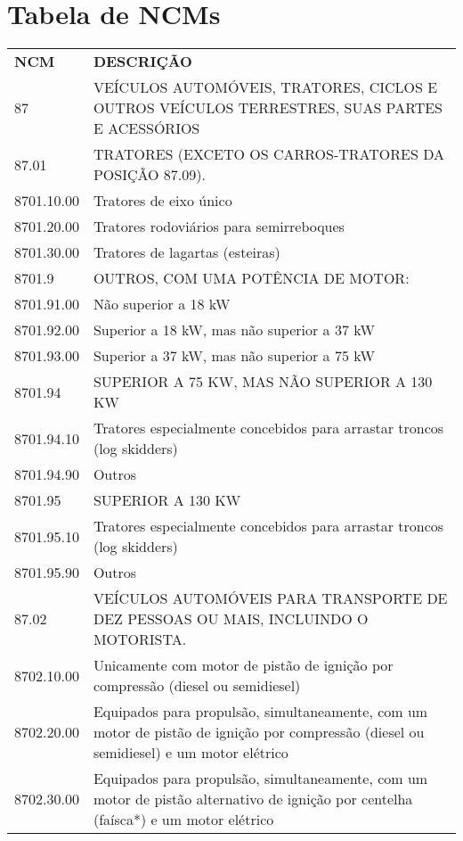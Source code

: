 \documentclass{article}
\begin{document}
\pagebreak
\section{Tabela de NCMs}
\label{sec:tabela-ncm}
\begin{center}
  \begin{longtable}{
    |p{}
    |p{}|
  }
    \hline
    \rowcolor{darkGrey}
    \textbf{NCM} & \textbf{DESCRIÇÃO} \\
    87 & VEÍCULOS AUTOMÓVEIS, TRATORES, CICLOS E OUTROS VEÍCULOS TERRESTRES, SUAS PARTES E ACESSÓRIOS \\
    87.01 & TRATORES (EXCETO OS CARROS-TRATORES DA POSIÇÃO 87.09). \\
    8701.10.00 & Tratores de eixo único \\
    8701.20.00 & Tratores rodoviários para semirreboques \\
    8701.30.00 & Tratores de lagartas (esteiras) \\
    8701.9 & OUTROS, COM UMA POTÊNCIA DE MOTOR: \\
    8701.91.00 & Não superior a 18 kW \\
    8701.92.00 & Superior a 18 kW, mas não superior a 37 kW \\
    8701.93.00 & Superior a 37 kW, mas não superior a 75 kW \\
    8701.94 & SUPERIOR A 75 KW, MAS NÃO SUPERIOR A 130 KW \\
    8701.94.10 & Tratores especialmente concebidos para arrastar troncos (log skidders) \\
    8701.94.90 & Outros \\
    8701.95 & SUPERIOR A 130 KW \\
    8701.95.10 & Tratores especialmente concebidos para arrastar troncos (log skidders) \\
    8701.95.90 & Outros \\
    87.02 & VEÍCULOS AUTOMÓVEIS PARA TRANSPORTE DE DEZ PESSOAS OU MAIS, INCLUINDO O MOTORISTA. \\
    8702.10.00 & Unicamente com motor de pistão de ignição por compressão (diesel ou semidiesel) \\
    8702.20.00 & Equipados para propulsão, simultaneamente, com um motor de pistão de ignição por compressão (diesel ou semidiesel) e um motor elétrico \\
    8702.30.00 & Equipados para propulsão, simultaneamente, com um motor de pistão alternativo de ignição por centelha (faísca*) e um motor elétrico \\

\end{longtable}
\end{center}
\end{document}
